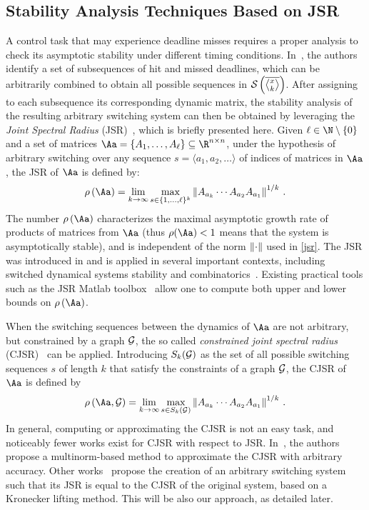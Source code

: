 \subsection{Stability Analysis Techniques Based on JSR}
\label{sec:existing}
A control task that may experience deadline misses requires a proper analysis to check its asymptotic stability under different timing conditions. 
In~\cite{Maggio:2020}, the authors identify a set of subsequences of hit and missed deadlines, which can be arbitrarily combined to obtain all possible sequences in $\sset{}{\rowmiss{}}$.
After assigning to each subsequence its corresponding dynamic matrix, the stability analysis of the resulting arbitrary switching system can then be obtained by leveraging the \emph{Joint Spectral Radius} (JSR)~\cite{Jungers2009}, which is briefly presented here.
%
Given $\ell\in\N\setminus \left\{ 0 \right\} $ and a set of matrices $\Aa = \{A_1, \ldots, A_\ell \} \subseteq \R^{n\times n}$, under the hypothesis of arbitrary switching over any sequence $s=\langle a_1,a_2,\dots \rangle$ of indices of matrices in $\Aa$, the JSR of $\Aa$ is defined by:
\begin{equation}
    \label{jsr}
    \rho\left(\Aa\right)= \lim_{k\rightarrow\infty} \max_{s\in\{1,\ldots,\ell\}^k} \norm{A_{a_k} \cdots A_{a_2}A_{a_1}}^{1/k} \,.
\end{equation}
The number $\rho\left(\Aa\right)$ characterizes the maximal asymptotic growth rate of products of matrices from $\Aa$ (thus  $\rho(\Aa)<1$ means that the system is asymptotically stable), and is independent of the norm $\left\lVert\cdot\right\rVert$ used in \eqref{jsr}.
%
The JSR was introduced in \cite{rota} and is applied in several important contexts, including switched dynamical systems stability and combinatorics~\cite{Jungers2009}.
Existing practical tools such as the JSR Matlab toolbox~\cite{vankeerberghen2014jsr} allow one to compute both upper and lower bounds on $\rho\left(\Aa\right)$.

When the switching sequences between the dynamics of $\Aa$ are not arbitrary, but constrained by a graph $\mathcal{G}_{}$, the so called \emph{constrained joint spectral radius} (CJSR)~\cite{dai2012gelfand} can be applied.
Introducing ${S}_k(\mathcal{G}_{})$ as the set of all possible switching sequences $s$ of length $k$ that satisfy the constraints of a graph $\mathcal{G}_{}$, the CJSR of $\Aa$ is defined by
\begin{equation}
\label{cjsr}
    \rho\left(\Aa,\GG{}\right)= \lim_{k\rightarrow\infty} \max_{s\in{S}_k(\GG{})} \norm{A_{a_k} \cdots A_{a_2}A_{a_1}}^{1/k} \,.
\end{equation}
In general, computing or approximating the CJSR is not an easy task, and noticeably fewer works exist for CJSR with respect to JSR.
In~\cite{philippe2016stability}, the authors propose a multinorm-based method to approximate the CJSR with arbitrary accuracy.
Other works~\cite{kozyakin2014berger, wang2014stability, xu2020approximation} propose the creation of an arbitrary switching system such that its JSR is equal to the CJSR of the original system, based on a Kronecker lifting method.
This will be also our approach, as detailed later.

